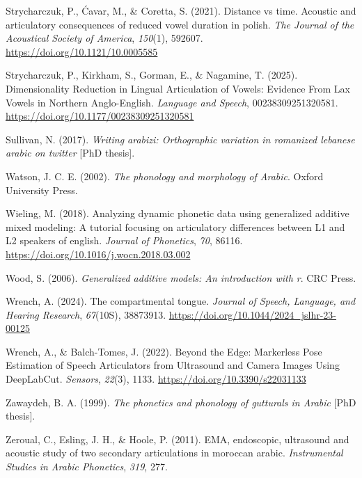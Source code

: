 \documentclass[
  man,
  longtable,
  nolmodern,
  notxfonts,
  notimes,
  colorlinks=true,linkcolor=blue,citecolor=blue,urlcolor=blue]{apa7}
\newlength{\cslhangindent}
\newenvironment{CSLReferences}[2] %
 {\begin{list}{}{%
  \setlength{\itemindent}{0pt}
  \setlength{\leftmargin}{0pt}
  \setlength{\parsep}{0pt}
  \ifodd #1
   \setlength{\leftmargin}{\cslhangindent}
   \setlength{\itemindent}{-1\cslhangindent}
  \fi
  \setlength{\itemsep}{#2\baselineskip}}}
 {\end{list}}
\begin{document}
\begin{CSLReferences}{1}{0}
Strycharczuk, P., Ćavar, M., \& Coretta, S. (2021). Distance vs time.
Acoustic and articulatory consequences of reduced vowel duration in
polish. \emph{The Journal of the Acoustical Society of America},
\emph{150}(1), 592607. \url{https://doi.org/10.1121/10.0005585}

Strycharczuk, P., Kirkham, S., Gorman, E., \& Nagamine, T. (2025).
Dimensionality Reduction in Lingual Articulation of Vowels: Evidence
From Lax Vowels in Northern Anglo-English. \emph{Language and Speech},
00238309251320581. \url{https://doi.org/10.1177/00238309251320581}

Sullivan, N. (2017). \emph{Writing arabizi: Orthographic variation in
romanized lebanese arabic on twitter} {[}PhD thesis{]}.

Watson, J. C. E. (2002). \emph{The phonology and morphology of Arabic}.
Oxford University Press.

Wieling, M. (2018). Analyzing dynamic phonetic data using generalized
additive mixed modeling: A tutorial focusing on articulatory differences
between L1 and L2 speakers of english. \emph{Journal of Phonetics},
\emph{70}, 86116. \url{https://doi.org/10.1016/j.wocn.2018.03.002}

Wood, S. (2006). \emph{Generalized additive models: An introduction with
r}. CRC Press.

Wrench, A. (2024). The compartmental tongue. \emph{Journal of Speech,
Language, and Hearing Research}, \emph{67}(10S), 38873913.
\url{https://doi.org/10.1044/2024_jslhr-23-00125}

Wrench, A., \& Balch-Tomes, J. (2022). Beyond the Edge: Markerless Pose
Estimation of Speech Articulators from Ultrasound and Camera Images
Using DeepLabCut. \emph{Sensors}, \emph{22}(3), 1133.
\url{https://doi.org/10.3390/s22031133}

Zawaydeh, B. A. (1999). \emph{The phonetics and phonology of gutturals
in Arabic} {[}PhD thesis{]}.

Zeroual, C., Esling, J. H., \& Hoole, P. (2011). EMA, endoscopic,
ultrasound and acoustic study of two secondary articulations in moroccan
arabic. \emph{Instrumental Studies in Arabic Phonetics}, \emph{319},
277.

\end{CSLReferences}
\end{document}
